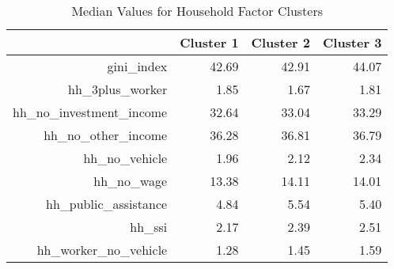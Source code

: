 \begin{table}[ht]
    \centering
    \caption{Median Values for Household Factor Clusters}
    \label{tab:waid}
    \begin{tabular}{|r|r|r|r|}
      \hline
     & Cluster 1 & Cluster 2 & Cluster 3 \\ 
      \hline
    gini\_index & 42.69 & 42.91 & 44.07 \\ 
    \hline
      hh\_3plus\_worker & 1.85 & 1.67 & 1.81 \\ 
      \hline
      hh\_no\_investment\_income & 32.64 & 33.04 & 33.29 \\ 
      \hline
      hh\_no\_other\_income & 36.28 & 36.81 & 36.79 \\ 
      \hline
      hh\_no\_vehicle & 1.96 & 2.12 & 2.34 \\ 
      \hline
      hh\_no\_wage & 13.38 & 14.11 & 14.01 \\ 
      \hline
      hh\_public\_assistance & 4.84 & 5.54 & 5.40 \\ 
      \hline
      hh\_ssi & 2.17 & 2.39 & 2.51 \\ 
      \hline
      hh\_worker\_no\_vehicle & 1.28 & 1.45 & 1.59 \\ 
       \hline
    \end{tabular}
    \end{table}